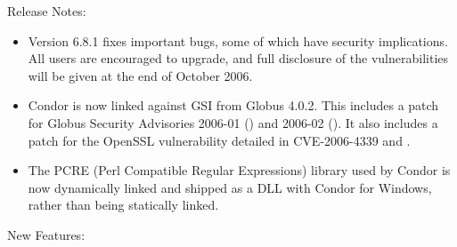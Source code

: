 \noindent Release Notes:

\begin{itemize}

\item Version 6.8.1 fixes important bugs, some of which have
security implications.  All users are encouraged to upgrade, and full
disclosure of the vulnerabilities will be given at the end of October 2006.

\item Condor is now linked against GSI from Globus 4.0.2. This includes
a patch for Globus Security Advisories 2006-01 
()
and 2006-02 
().
It also includes a
patch for the OpenSSL vulnerability detailed in CVE-2006-4339 and
.

\item The PCRE (Perl Compatible Regular Expressions) library used by
Condor is now dynamically linked and shipped as a DLL with Condor for
Windows, rather than being statically linked.

\end{itemize}


\noindent New Features:

